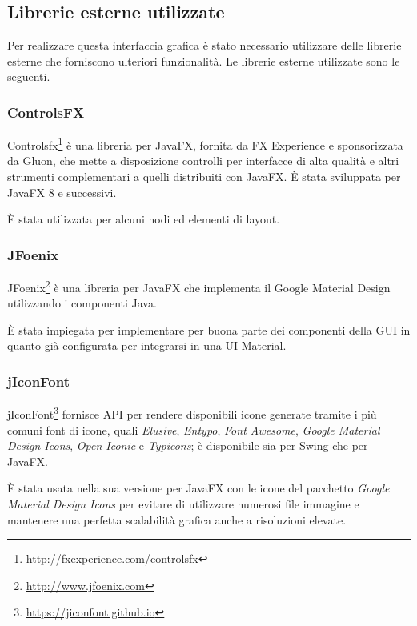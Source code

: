 
        \subsection{Librerie esterne utilizzate}\label{subsec:lib}
            Per realizzare questa interfaccia grafica è stato necessario utilizzare delle librerie esterne che forniscono ulteriori funzionalità.
            Le librerie esterne utilizzate sono le seguenti.

            \subsubsection{ControlsFX}\label{subsubsec:controlsfx}
                Controlsfx\footnote{\url{http://fxexperience.com/controlsfx}} è una libreria  per JavaFX, fornita da FX Experience e sponsorizzata da Gluon, che mette a disposizione controlli per interfacce di alta qualità e altri strumenti complementari a quelli distribuiti con JavaFX.
                È stata sviluppata per JavaFX 8 e successivi.

                È stata utilizzata per alcuni nodi ed elementi di layout.

            \subsubsection{JFoenix}\label{subsubsec:jfoenix}
                JFoenix\footnote{\url{http://www.jfoenix.com}} è una libreria  per JavaFX che implementa il Google Material Design utilizzando i componenti Java.

                È stata impiegata per implementare per buona parte dei componenti della GUI in quanto già configurata per integrarsi in una UI Material.

            \subsubsection{jIconFont}\label{subsubsec:jiconfont}
                jIconFont\footnote{\url{https://jiconfont.github.io}} fornisce API per rendere disponibili icone generate tramite i più comuni font di icone, quali \emph{Elusive}, \emph{Entypo}, \emph{Font Awesome}, \emph{Google Material Design Icons}, \emph{Open Iconic} e \emph{Typicons};
                è disponibile sia per Swing che per JavaFX.

                È stata usata nella sua versione per JavaFX con le icone del pacchetto \emph{Google Material Design Icons} per evitare di utilizzare numerosi file immagine e mantenere una perfetta scalabilità grafica anche a risoluzioni elevate.

